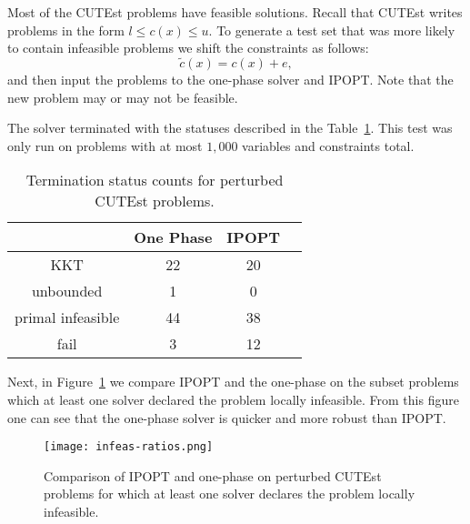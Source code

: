 \documentclass{article}
\begin{document}
Most of the CUTEst problems have feasible solutions. Recall that CUTEst writes problems in the form $l \le c(x) \le u$.
To generate a test set that was more likely to contain infeasible problems we shift the constraints as follows:
$$
\tilde{c}(x) = c(x) + e,
$$
and then input the problems to the one-phase solver and IPOPT. Note that the new problem may or may not be feasible.

The solver terminated with the statuses described in the Table~\ref{tbl:termination-status-counts-peturbed}. This test was only run on problems with at most $1,000$ variables and constraints total.
\begin{table}[H]
\caption{Termination status counts for perturbed CUTEst problems.}\label{tbl:termination-status-counts-peturbed}
\begin{tabular}{ c c c r }
 &  One Phase &  IPOPT &  \\
  \hline
KKT & 22 & 20 \\
unbounded & 1 & 0  \\
primal infeasible & 44 &  38 \\
fail & 3 & 12 \\
\end{tabular}
\end{table}

Next, in Figure~\ref{fig:comparison-IPOPT-on-perturbed-CUTEst} we compare IPOPT and the one-phase on the subset problems which at least one solver declared the problem locally infeasible. From this figure one can see that the one-phase solver is quicker and more robust than IPOPT.

\begin{figure}[H]
\texttt{[image: infeas-ratios.png]}
\caption{Comparison of IPOPT and one-phase on perturbed CUTEst problems for which at least one solver declares the problem locally infeasible.}\label{fig:comparison-IPOPT-on-perturbed-CUTEst}
\end{figure}

%
%
%
%
\end{document}
